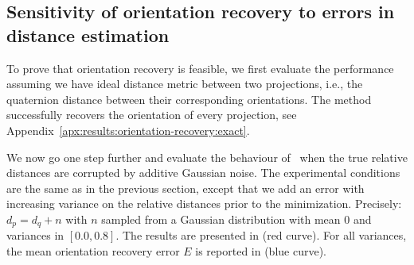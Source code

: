 \subsection{Sensitivity of orientation recovery to errors in distance estimation}\label{sec:results:orientation-recovery:sensitivity}


To prove that orientation recovery is feasible, we first evaluate the performance assuming we have ideal distance metric between two projections, i.e., the quaternion distance between their corresponding orientations. 
The method successfully recovers the orientation of every projection, see Appendix~\ref{apx:results:orientation-recovery:exact}.

We now go one step further and evaluate the behaviour of~ when the true relative distances are corrupted by additive Gaussian noise.
The experimental conditions are the same as in the previous section, except that we add an error with increasing variance on the relative distances prior to the minimization. Precisely: $d_p = d_q + n$ with $n$ sampled from a Gaussian distribution with mean 0 and variances in $[0.0, 0.8]$.
The results are presented in  (red curve).
For all variances, the mean orientation recovery error $E$ is reported in  (blue curve).

